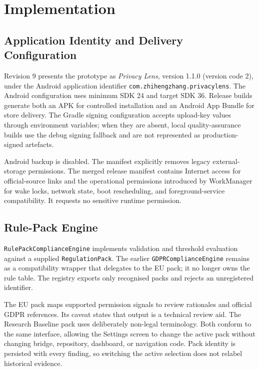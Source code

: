 \section{Implementation}

\subsection{Application Identity and Delivery Configuration}

Revision 9 presents the prototype as \emph{Privacy Lens}, version 1.1.0 (version code 2), under the Android application identifier \texttt{com.zhihengzhang.privacylens}. The Android configuration uses minimum SDK 24 and target SDK 36. Release builds generate both an APK for controlled installation and an Android App Bundle for store delivery. The Gradle signing configuration accepts upload-key values through environment variables; when they are absent, local quality-assurance builds use the debug signing fallback and are not represented as production-signed artefacts.

Android backup is disabled. The manifest explicitly removes legacy external-storage permissions. The merged release manifest contains Internet access for official-source links and the operational permissions introduced by WorkManager for wake locks, network state, boot rescheduling, and foreground-service compatibility. It requests no sensitive runtime permission.

\subsection{Rule-Pack Engine}

\texttt{RulePackComplianceEngine} implements validation and threshold evaluation against a supplied \texttt{RegulationPack}. The earlier \texttt{GDPRComplianceEngine} remains as a compatibility wrapper that delegates to the EU pack; it no longer owns the rule table. The registry exports only recognised packs and rejects an unregistered identifier.

The EU pack maps supported permission signals to review rationales and official GDPR references. Its caveat states that output is a technical review aid. The Research Baseline pack uses deliberately non-legal terminology. Both conform to the same interface, allowing the Settings screen to change the active pack without changing bridge, repository, dashboard, or navigation code. Pack identity is persisted with every finding, so switching the active selection does not relabel historical evidence.

